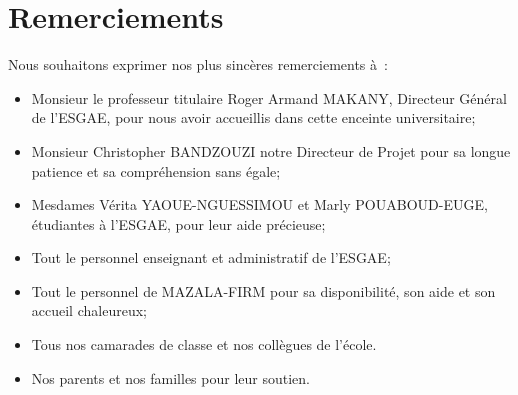 \chapter*{Remerciements}

Nous souhaitons exprimer nos plus sincères remerciements à :

\begin{itemize}
  \item Monsieur le professeur titulaire Roger Armand MAKANY, Directeur Général de l’ESGAE,
      pour nous avoir accueillis dans cette enceinte universitaire;

  \item Monsieur Christopher BANDZOUZI notre Directeur de Projet pour sa
      longue patience et sa compréhension sans égale;

  \item Mesdames Vérita YAOUE-NGUESSIMOU et Marly POUABOUD-EUGE, étudiantes à l’ESGAE, pour
      leur aide précieuse;

  \item Tout le personnel enseignant et administratif de l’ESGAE;


  \item Tout le personnel de MAZALA-FIRM pour sa disponibilité, son aide et son
      accueil chaleureux;

  \item Tous nos camarades de classe et nos collègues de l’école.

  \item Nos parents et nos familles pour leur soutien.

\end{itemize}
